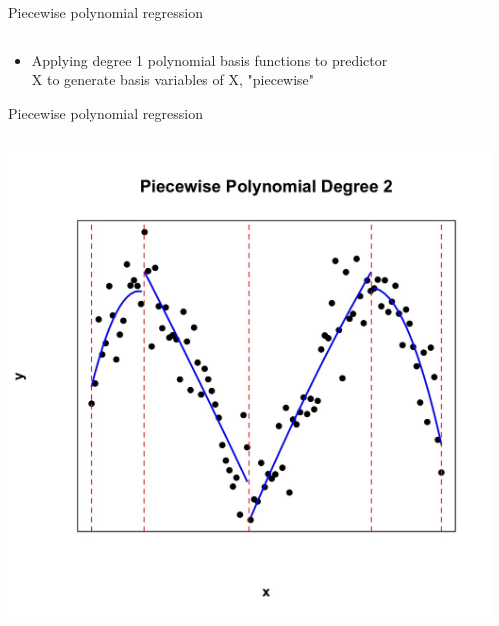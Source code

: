 \documentclass[english]{beamer}
\newcommand{\alertblue}[1]{{\color{blue}#1}}
\begin{document}
\begin{frame}{Piecewise polynomial regression}
\begin{columns}
\begin{column}{0.5\textwidth}
          \end{column}      
    \end{columns}
    \begin{itemize}
        \item Applying \alertblue{degree 1 polynomial basis functions} to predictor \\ X to generate \alertblue{basis variables of X, "piecewise"}
    \end{itemize}
\end{frame}
\begin{frame}{Piecewise polynomial regression}
    
    \begin{columns}
        \begin{column}{0.47\textwidth}
            \centering
            \includegraphics[width=\linewidth]{images/piecewise_degree_2.jpeg} 
        \end{column}
        \begin{column}{0.47\textwidth}
            \centering

\end{column}
\end{columns}
\end{frame}
\end{document}
